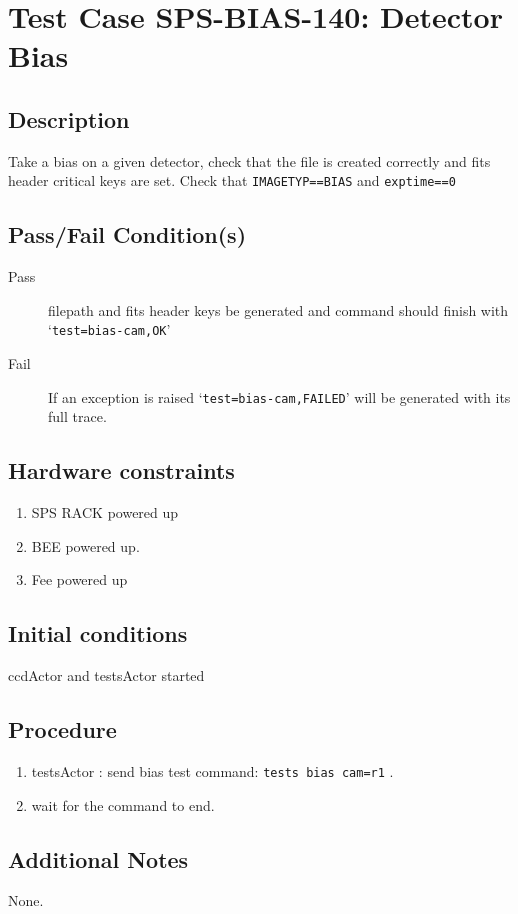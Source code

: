 \section{Test Case SPS-BIAS-140: Detector Bias}

\subsection{Description}

Take a bias on a given detector, check that the file is created correctly and fits header critical keys are set.
Check that \texttt{IMAGETYP==BIAS} and \texttt{exptime==0}


\subsection{Pass/Fail Condition(s)}

\begin{description}
\item [Pass] filepath and fits header keys be generated and command should finish with `\texttt{test=bias-cam,OK}'
\item [Fail] If an exception is raised `\texttt{test=bias-cam,FAILED}' will be generated with its full trace.

\end{description}

\subsection{Hardware constraints}

\begin{enumerate}
    \item SPS RACK powered up
    \item \acrshort{BEE} powered up.
    \item Fee powered up
\end{enumerate}

\subsection{Initial conditions}

ccdActor and testsActor started

\subsection{Procedure}

\begin{enumerate}
    \item testsActor : send bias test command: \texttt{tests bias cam=r1} .
    \item wait for the command to end.
\end{enumerate}

\subsection{Additional Notes}
None.

